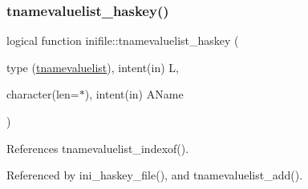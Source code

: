 \mbox{\label{namespaceinifile_af36608910f6418a922996326dd9a97e3}} 
\subsubsection{\texorpdfstring{tnamevaluelist\+\_\+haskey()}{tnamevaluelist\_haskey()}}
{\footnotesize\ttfamily logical function inifile\+::tnamevaluelist\+\_\+haskey (\begin{DoxyParamCaption}\item[{type (\mbox{\hyperlink{structinifile_1_1tnamevaluelist}{tnamevaluelist}}), intent(in)}]{L,  }\item[{character(len=$\ast$), intent(in)}]{A\+Name }\end{DoxyParamCaption})}



References tnamevaluelist\+\_\+indexof().



Referenced by ini\+\_\+haskey\+\_\+file(), and tnamevaluelist\+\_\+add().


